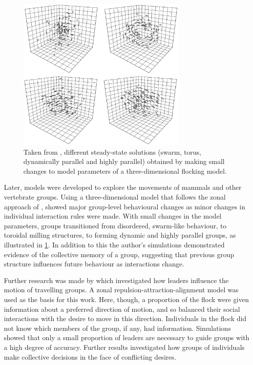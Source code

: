 \begin{figure}[tb]
	\includegraphics[width=0.75\textwidth]{couzin.png}
    \caption{Taken from \textcite{couzin02}, different steady-state
    solutions (swarm, torus, dynamically parallel and highly parallel) obtained
    by making small changes to model parameters of a three-dimensional flocking
    model.}
	\label{fig:couzin}
\end{figure}

Later, models were developed to explore the movements of mammals and other
vertebrate groups. Using a three-dimensional model that follows the zonal
approach of \textcite{aoki82}, \textcite{couzin02} showed major group-level
behavioural changes as minor changes in individual interaction rules were made.
With small changes in the model parameters, groups transitioned from
disordered, swarm-like behaviour, to toroidal milling structures, to forming
dynamic and highly parallel groups, as illustrated in \cref{fig:couzin}. In
addition to this the author's simulations demonstrated evidence of the
collective memory of a group, suggesting that previous group structure
influences future behaviour as interactions change.

Further research was made by \textcite{couzin05} which investigated how leaders
influence the motion of travelling groups. A zonal
repulsion-attraction-alignment model was used as the basis for this work. Here,
though, a proportion of the flock were given information about a preferred
direction of motion, and so balanced their social interactions with the desire
to move in this direction. Individuals in the flock did not know which members
of the group, if any, had information. Simulations showed that only a small
proportion of leaders are necessary to guide groups with a high degree of
accuracy. Further results investigated how groups of individuals make
collective decisions in the face of conflicting desires.

